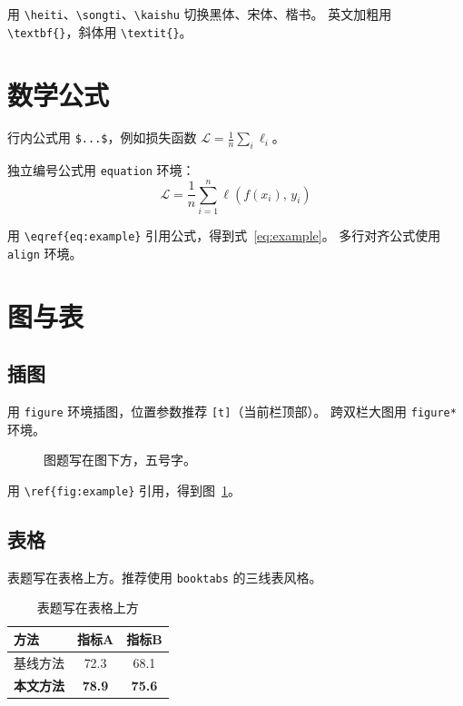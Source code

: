 \documentclass[10pt, a4paper]{article}
\begin{document}
用 \verb|\heiti|、\verb|\songti|、\verb|\kaishu| 切换黑体、宋体、楷书。
英文加粗用 \verb|\textbf{}|，斜体用 \verb|\textit{}|。

\section{数学公式}

行内公式用 \verb|$...$|，例如损失函数 $\mathcal{L} = \frac{1}{n}\sum_i \ell_i$。

独立编号公式用 \texttt{equation} 环境：
\begin{equation}
  \mathcal{L} = \frac{1}{n}\sum_{i=1}^{n} \ell\!\left(f(x_i),\, y_i\right)
  \label{eq:example}
\end{equation}

用 \verb|\eqref{eq:example}| 引用公式，得到式~\eqref{eq:example}。
多行对齐公式使用 \texttt{align} 环境。

\section{图与表}

\subsection{插图}

用 \texttt{figure} 环境插图，位置参数推荐 \verb|[t]|（当前栏顶部）。
跨双栏大图用 \verb|figure*| 环境。

\begin{figure}[t]
  \centering
  \fbox{\rule{0pt}{2.5cm}\rule{\linewidth}{0pt}}
  \caption{图题写在图下方，五号字。}
  \label{fig:example}
\end{figure}

用 \verb|\ref{fig:example}| 引用，得到图~\ref{fig:example}。

\subsection{表格}

表题写在表格上方。推荐使用 \texttt{booktabs} 的三线表风格。

\begin{table}[t]
  \centering
  \caption{表题写在表格上方}
  \label{tab:example}
  \begin{tabular}{lcc}
    \toprule
    方法 & 指标A & 指标B \\
    \midrule
    基线方法 & 72.3 & 68.1 \\
    \textbf{本文方法} & \textbf{78.9} & \textbf{75.6} \\
    \bottomrule
  \end{tabular}
\end{table}
\end{document}
